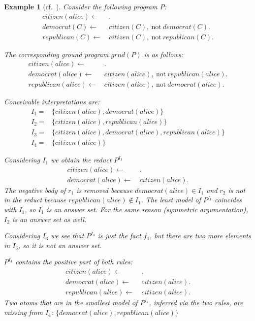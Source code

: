 \documentclass{vutinfth} %
\newtheorem{example}{Example}[section]
\newcommand{\fail}{\mathrm{not } \ \xspace}
\newcommand{\from}{\ensuremath{\leftarrow}}
\begin{document}
\begin{example}[{cf.~\cite[Example 16]{DBLP:conf/rweb/EiterIK09}}]
Consider the following program $P$:
\begin{align*}
citizen(alice)\from& \ .\\
democrat(C) \from& \ citizen(C),~\fail democrat(C).\\
republican(C) \from& \ citizen(C),~\fail republican(C).
\end{align*}

The corresponding ground program $grnd(P)$ is as follows:
\begin{align}
citizen(alice)\from& \ . \tag{$f_1$} \\
democrat(alice) \from& \ citizen(alice),~\fail republican(alice). \tag{$r_1$} \\
republican(alice) \from& \ citizen(alice),~\fail democrat(alice). \tag{$r_2$} 
\end{align}

Conceivable interpretations are:
\begin{align*}
I_1 =& \{ citizen(alice), democrat(alice) \}\\
I_2 =& \{ citizen(alice), republican(alice) \}\\
I_3 =& \{ citizen(alice), democrat(alice), republican(alice) \}\\
I_4 =& \{ citizen(alice) \}
\end{align*}

Considering $I_1$ we obtain the reduct $P^{I_1}$
\begin{align*}
citizen(alice)\from& \ .\\
democrat(alice) \from& \ citizen(alice).
\end{align*}
The negative body of $r_1$ is removed because $democrat(alice) \in I_1$ and $r_2$ is not in the reduct because $republican(alice) \not \in I_1$. The least model of $P^{I_1}$ coincides with $I_1$, so $I_1$ is an answer set. For the same reason (symmetric argumentation), $I_2$ is an answer set as well.

Considering $I_3$ we see that $P^{I_3}$ is just the fact $f_1$, but there are two more elements in $I_3$, so it is not an answer set.

$P^{I_4}$ contains the positive part of both rules:
\begin{align*}
citizen(alice)\from& \ . \\
democrat(alice) \from& \ citizen(alice). \\
republican(alice) \from& \ citizen(alice).
\end{align*}
Two atoms that are in the smallest model of $P^{I_4}$, inferred via the two rules, are missing from $I_4$: $\{democrat(alice), republican(alice) \}$
\end{example}
\end{document}
